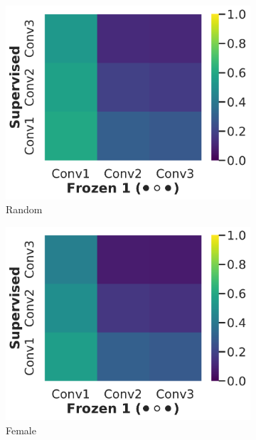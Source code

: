 \documentclass[letterpaper]{article} %
\begin{document}
\begin{figure}
\begin{subfigure}[]{0.35\linewidth}
    \includegraphics[trim={0 0.4cm 3cm 0},clip,width=\linewidth]{img/supervised-frozen1m-cka-balanced-random.pdf}
    \caption{Random}
\end{subfigure}
\begin{subfigure}[]{0.27\linewidth}
    \includegraphics[trim={3cm 0.4cm 3cm 0},clip,width=\linewidth]{img/supervised-frozen1m-cka-female.pdf}
    \caption{Female}
\end{subfigure} %
\begin{subfigure}[]{0.35\linewidth}

\end{subfigure}
\end{figure}
\end{document}
